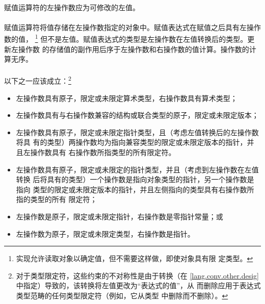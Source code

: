 {                                            
\syntax
\paragraph{}
  \synprd[]{\tm{= *= /= \%= += -= \tl{}\tl= \tg{}\tg= \&= \^{}= |=}}

\constraint
\paragraph{}
赋值运算符的左操作数应为可修改的左值。

\semantic
\paragraph{}
赋值运算符将值存储在左操作数指定的对象中。赋值表达式在赋值之后具有左操作数的值，
\footnote{实现允许读取对象以确定值，但不需要这样做，即使对象具有限
定类型。} 但不是左值。赋值表达式的类型是左操作数在左值转换后的类型。更新左操作数
的存储值的副作用后序于左操作数和右操作数的值计算。操作数的计算无序。

\constraint
\paragraph{}
以下之一应该成立：\footnote{对于类型限定符，这些约束的不对称性是由于转换（在
\ref{lang.conv.other.desig}中指定）导致的，该转换将左值更改为``表达式的值''，从
而删除应用于表达式类型范畴的任何类型限定符（例如，它从类型
中删除而不删除）。}
\begin{itemize}
  \item{左操作数具有原子，限定或未限定算术类型，右操作数具有算术类型；}
  \item{左操作数具有与右操作数兼容的结构或联合类型的原子，限定或未限定版本；}
  \item{左操作数具有原子，限定或未限定指针类型，且（考虑左值转换后的左操作数将具
    有的类型）两操作数均为指向兼容类型的限定或未限定版本的指针，并且左操作数具有
    右操作数所指类型的所有限定符。}
  \item{左操作数具有原子，限定或未限定的指针类型，并且（考虑到左操作数在左值转换
    后将具有的类型）一个操作数是指向对象类型的指针，另一个操作数是指向
    类型的限定或未限定版本的指针，并且左侧指向的类型具有右操作数所指的类型的所有
    限定符；}
  \item{左操作数是原子，限定或未限定指针，右操作数是零指针常量；或}
  \item{左操作数为原子，限定或未限定类型，右操作数是指针。}
\end{itemize}

}
